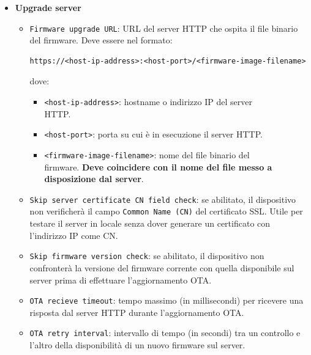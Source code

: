 \documentclass[a4paper]{article}
\begin{document}
\begin{itemize}
\begin{itemize}
      \item \textbf{Upgrade server}
        \begin{itemize}
          \item \texttt{Firmware upgrade URL}: URL del server HTTP che ospita il file
            binario del firmware. Deve essere nel formato:
\begin{lstlisting}
https://<host-ip-address>:<host-port>/<firmware-image-filename>
\end{lstlisting}
            dove:
            \begin{itemize}
              \item \texttt{<host-ip-address>}: hostname o indirizzo IP del server\\ HTTP.
              \item \texttt{<host-port>}: porta su cui è in esecuzione il server HTTP.
              \item \texttt{<firmware-image-filename>}: nome del file binario del\\ firmware.
                \textbf{Deve coincidere con il nome del file messo a disposizione dal server}.
            \end{itemize}

          \item \texttt{Skip server certificate CN field check}: se abilitato, il
            dispositivo non verificherà il campo \texttt{Common Name (CN)} del
            certificato SSL. Utile per testare il server in locale senza dover generare
            un certificato con l'indirizzo IP come CN.

          \item \texttt{Skip firmware version check}: se abilitato, il dispositivo non
            confronterà la versione del firmware corrente con quella disponibile sul
            server prima di effettuare l'aggiornamento OTA.

          \item \texttt{OTA recieve timeout}: tempo massimo (in millisecondi)
            per ricevere una risposta dal server HTTP durante l'aggiornamento OTA.

          \item \texttt{OTA retry interval}: intervallo di tempo (in secondi) tra un
            controllo e l'altro della disponibilità di un nuovo firmware sul server.
        \end{itemize}

    \end{itemize}
\end{itemize}
\end{document}
